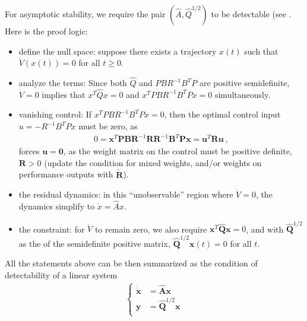 \documentclass[letterpaper,10pt,english]{jupyterBook}
\begin{document}
\sphinxAtStartPar
For asymptotic stability, we require the pair \((\hat{A}, \hat{Q}^{1/2})\) to be detectable (see {\hyperref[\detokenize{ch/system-theory/observability-detectability:observability-detectability}]{}}. Here is the proof logic:
\begin{itemize}
\item {} 
\sphinxAtStartPar
define the null space: suppose there exists a trajectory \(x(t)\) such that \(\dot{V}(x(t)) = 0\) for all \(t \geq 0\).

\item {} 
\sphinxAtStartPar
analyze the terms: Since both \(\hat{Q}\) and \(PBR^{-1}B^TP\) are positive semi\sphinxhyphen{}definite, \(\dot{V} = 0\) implies that \(x^T \hat{Q} x = 0\) and \(x^T PBR^{-1}B^TP x = 0\) simultaneously.

\item {} 
\sphinxAtStartPar
vanishing control: If \(x^T PBR^{-1}B^TP x = 0\), then the optimal control input \(u = -R^{-1}B^T P x\) must be zero, as
\begin{equation*}
\begin{split}0 = \mathbf{x}^T \mathbf{P} \mathbf{B} \mathbf{R}^{-1} \mathbf{R} \mathbf{R}^{-1} \mathbf{B}^T \mathbf{P} \mathbf{x} = \mathbf{u}^T \mathbf{R} \mathbf{u} \ ,\end{split}
\end{equation*}
\sphinxAtStartPar
forces \(\mathbf{u} = \mathbf{0}\), as the weight matrix on the control must be positive definite, \(\mathbf{R} > 0\) (update the condition for mixed weights, and/or weights on performance outputs with \(\widetilde{\mathbf{R}}\)).

\item {} 
\sphinxAtStartPar
the residual dynamics: in this “unobservable” region where \(\dot{V}=0\), the dynamics simplify to \(\dot{x} = \hat{A} x\).

\item {} 
\sphinxAtStartPar
the constraint: for \(\dot{V}\) to remain zero, we also require \(\mathbf{x}^T \hat{\mathbf{Q}} \mathbf{x} = 0\), and with \(\hat{\mathbf{Q}}^{1/2}\) as the {\hyperref[\detokenize{ch/linear-algebra/cholesky:math-cholesky}]{}} of the semi\sphinxhyphen{}definite positive matrix, \(\hat{\mathbf{Q}}^{1/2} \mathbf{x}(t) = 0\) for all \(t\).

\end{itemize}

\sphinxAtStartPar
All the statements above can be then summarized as the condition of detectability of a linear system
\begin{equation*}
\begin{split}\left\{\begin{aligned}
  \dot{\mathbf{x}} & = \hat{\mathbf{A}} \mathbf{x} \\
       \mathbf{y}  & = \hat{\mathbf{Q}}^{1/2} \mathbf{x} \\
\end{aligned}\right.\end{split}
\end{equation*}
\sphinxAtStartPar
{} 
\end{document}
